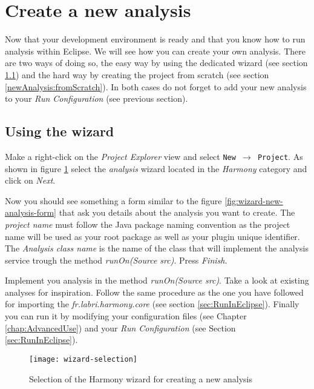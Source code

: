 \section{Create a new analysis}

Now that your development environment is ready and that you know how to run analysis within Eclipse. We will see how you can create your own analysis. There are two ways of doing so, the easy way by using the dedicated wizard (see section \ref{newAnalysis:wizard}) and the hard way by creating the project from scratch (see section \ref{newAnalysis:fromScratch}). In both cases do not forget to add your new analysis to your \emph{Run Configuration} (see previous section).

\subsection{Using the wizard}\label{newAnalysis:wizard}

Make a right-click on the \emph{Project Explorer} view and select \texttt{New $\rightarrow$ Project}. As shown in figure \ref{fig:wizard-selection} select the \emph{analysis} wizard located in the \emph{Harmony} category and click on \emph{Next}.

Now you should see something a form similar to the figure \ref{fig:wizard-new-analysis-form} that ask you details about the analysis you want to create. The \emph{project name} must follow the Java package naming convention as the project name will be used as your root package as well as your plugin unique identifier. The \emph{Analysis class name} is the name of the class that will implement the analysis service trough the method \emph{runOn(Source src)}. Press \emph{Finish}.

Implement you analysis in the method \emph{runOn(Source src)}. Take a look at existing analyses for inspiration. Follow the same procedure as the one you have followed for importing the \emph{fr.labri.harmony.core} (see section \ref{sec:RunInEclipse}). Finally you can run it by modifying your configuration files (see Chapter \ref{chap:AdvancedUse}) and your \emph{Run Configuration} (see Section \ref{sec:RunInEclipse}).


	\begin{figure}[H]
		\centering
		\texttt{[image: wizard-selection]}
		\caption{Selection of the Harmony wizard for creating a new analysis}
		\label{fig:wizard-selection}
	\end{figure}
	
